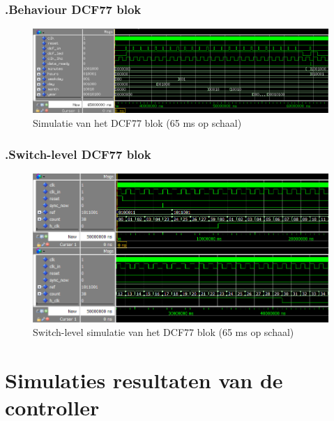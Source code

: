 \subsection*{\label{fig: beh}\thesubsection.\quad Behaviour DCF77 blok}
\begin{figure}[ht!]
\includegraphics[width=\textwidth,height=\textheight,keepaspectratio]{Figuren/DCF77/Behaviour.png}
\caption{Simulatie van het DCF77 blok (65 ms op schaal)}
\end{figure}
\subsection*{\label{fig: switchlevel}\thesubsection.\quad Switch-level DCF77 blok}
\begin{figure}[ht!]
\includegraphics[width=\textwidth,height=\textheight,keepaspectratio]{Figuren/DCF77/Mod60_teller.png}
\caption{Switch-level simulatie van het DCF77 blok (65 ms op schaal)}
\end{figure}


\chapter[Simulatie resultaten]{Simulaties resultaten van de controller}
\label{Ap:sim_controller}
